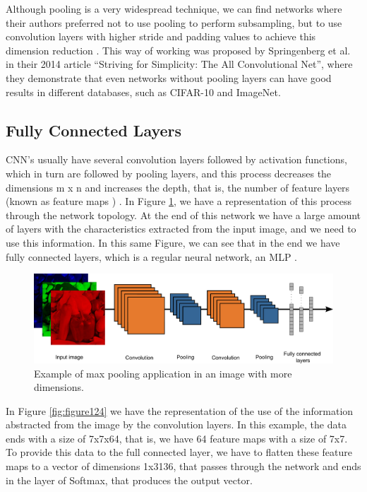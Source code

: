 Although pooling is a very widespread technique, we can find networks where their authors preferred not to use pooling to perform subsampling, but to use convolution layers with higher stride and padding values to achieve this dimension reduction \cite{elgendy2020}\cite{adrian2017}. This way of working was proposed by Springenberg et al. in their 2014 article “Striving for Simplicity: The All Convolutional Net”, where they demonstrate that even networks without pooling layers can have good results in different databases, such as CIFAR-10 and ImageNet.

\subsection{Fully Connected Layers}

CNN's usually have several convolution layers followed by activation functions, which in turn are followed by pooling layers, and this process decreases the dimensions m x n and increases the depth, that is, the number of feature layers (known as feature maps ) \cite{elgendy2020}\cite{geron2019}. In Figure \ref{fig:figure123}, we have a representation of this process through the network topology. At the end of this network we have a large amount of layers with the characteristics extracted from the input image, and we need to use this information. In this same Figure, we can see that in the end we have fully connected layers, which is a regular neural network, an MLP \cite{elgendy2020}.

\begin{figure}
    \centering
    \includegraphics[scale=0.22]{images/figure123.png}
    \caption{Example of max pooling application  in an image with more dimensions.}
    \label{fig:figure123}
\end{figure}

In Figure \ref{fig:figure124} we have the representation of the use of the information abstracted from the image by the convolution layers. In this example, the data ends with a size of 7x7x64, that is, we have 64 feature maps with a size of 7x7. To provide this data to the full connected layer, we have to flatten these feature maps to a vector of dimensions 1x3136, that passes through the network and ends in the layer of Softmax, that produces the output vector.

